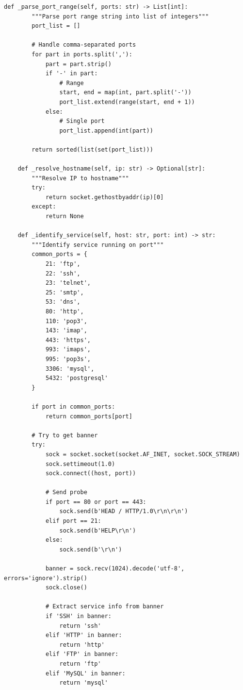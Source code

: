 \documentclass[12pt,a4paper]{report}
\begin{document}
\begin{lstlisting}[caption=Network Scanner Source Code]
    def _parse_port_range(self, ports: str) -> List[int]:
        """Parse port range string into list of integers"""
        port_list = []
        
        # Handle comma-separated ports
        for part in ports.split(','):
            part = part.strip()
            if '-' in part:
                # Range
                start, end = map(int, part.split('-'))
                port_list.extend(range(start, end + 1))
            else:
                # Single port
                port_list.append(int(part))
        
        return sorted(list(set(port_list)))
    
    def _resolve_hostname(self, ip: str) -> Optional[str]:
        """Resolve IP to hostname"""
        try:
            return socket.gethostbyaddr(ip)[0]
        except:
            return None
    
    def _identify_service(self, host: str, port: int) -> str:
        """Identify service running on port"""
        common_ports = {
            21: 'ftp',
            22: 'ssh',
            23: 'telnet',
            25: 'smtp',
            53: 'dns',
            80: 'http',
            110: 'pop3',
            143: 'imap',
            443: 'https',
            993: 'imaps',
            995: 'pop3s',
            3306: 'mysql',
            5432: 'postgresql'
        }
        
        if port in common_ports:
            return common_ports[port]
        
        # Try to get banner
        try:
            sock = socket.socket(socket.AF_INET, socket.SOCK_STREAM)
            sock.settimeout(1.0)
            sock.connect((host, port))
            
            # Send probe
            if port == 80 or port == 443:
                sock.send(b'HEAD / HTTP/1.0\r\n\r\n')
            elif port == 21:
                sock.send(b'HELP\r\n')
            else:
                sock.send(b'\r\n')
            
            banner = sock.recv(1024).decode('utf-8', errors='ignore').strip()
            sock.close()
            
            # Extract service info from banner
            if 'SSH' in banner:
                return 'ssh'
            elif 'HTTP' in banner:
                return 'http'
            elif 'FTP' in banner:
                return 'ftp'
            elif 'MySQL' in banner:
                return 'mysql'
                

\end{lstlisting}
\end{document}
